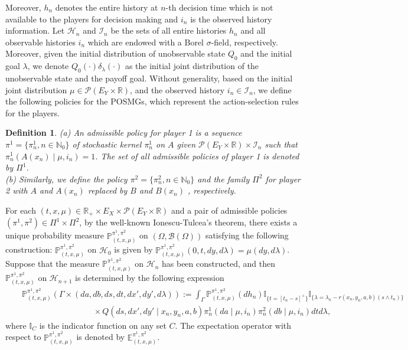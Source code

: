 \documentclass[12pt]{article}
\newtheorem{definition}{Definition}
\begin{document}
Moreover, $h_n$ denotes the entire history at $n$-th decision time which is  not available to the players for decision making and $i_n$ is the observed history  information.
Let $\mathscr{H}_n$ and $\mathscr{I}_n$ be the sets of all entire histories $h_n$ and all observable histories $i_n$ which are endowed with a Borel $\sigma$-field, respectively. Moreover, given the initial distribution of unobservable state $Q_0$ and the initial goal $\lambda$, we denote $Q_0(\cdot)\delta_{\lambda}(\cdot)$ as the initial joint distribution of  the unobservable state and the payoff goal. Without generality,
based on the initial joint distribution $\mu\in \mathscr{P}(E_Y\times \mathbb{R})$, and  the observed history $i_n\in  \mathscr{I}_n$, we define the following policies for the POSMGs, which represent the action-selection rules for the players.
\begin{definition}
	(a) An admissible policy for player 1 is a sequence $\pi^1=\{\pi_n^1,n\in\mathbb{N}_0\}$ of stochastic kernel $\pi_n^1$ on $A$
	given $\mathscr{P}(E_Y\times \mathbb{R}) \times \mathscr{I}_n$ such that $\pi_n^1(A(x_n)\mid \mu,i_n)=1$.
	The set of all admissible policies of player 1 is denoted by $\Pi^1$.\\
	(b) Similarly, we define the policy $\pi^2=\{\pi_n^2,n\in\mathbb{N}_0\}$ and the family $\Pi^2$ for player 2 with $A$ and $A(x_n)$ replaced by $B$ and $B(x_n)$ , respectively.
\end{definition}

For each $(t,x,\mu)\in \mathbb{R}_+\times E_X\times \mathscr{P}(E_Y\times \mathbb{R})$ and a pair of admissible policies $(\pi^1,\pi^2)\in \Pi^1\times \Pi^2$, by the well-known Ionescu-Tulcea's theorem, there exists a unique probability measure $\mathbb{P}^{\pi^1,\pi^2}_{(t,x,\mu)}$ on $(\Omega,\mathscr{B}(\Omega))$ satisfying the following construction:
$\mathbb{P}^{\pi^1,\pi^2}_{(t,x,\mu)}$ on $\mathscr{H}_0$ is given by $\mathbb{P}^{\pi^1,\pi^2}_{(t,x,\mu)}(0,t,dy,d\lambda)=\mu(dy,d\lambda)$.
Suppose that the measure $\mathbb{P}^{\pi^1,\pi^2}_{(t,x,\mu)}$ on $\mathscr{H}_n$ has been constructed, and then
$\mathbb{P}^{\pi^1,\pi^2}_{(t,x,\mu)}$  on $\mathscr{H}_{n+1}$ is determined by the following expression
\begin{eqnarray*}
	&&\mathbb{P}^{\pi^1,\pi^2}_{(t,x,\mu)}(\Gamma\times (da,db,ds,dt,dx',dy',d\lambda)):=\int_{\Gamma}\mathbb{P}^{\pi^1,\pi^2}_{(t,x,\mu)}(dh_n)\mathbb{I}_{\{t=[t_n-s]^+\}}\mathbb{I}_{\{\lambda=\lambda_n-r(x_n,y_n,a,b)(s\wedge t_n)\}}
	\nonumber\\
	&&~~~~~~~~~~~~~~~~~~~~~~~~~~~~~~~~~~~~~~~\times	Q(ds,dx',dy'\mid x_n,y_n,a,b)\pi_n^1(da\mid \mu, i_n)\pi_n^2(db\mid \mu,i_n)dtd\lambda,
\end{eqnarray*}
where $\mathbb{I}_C$ is the indicator function on any set $C$.
The expectation operator with respect to $\mathbb{P}^{\pi^1,\pi^2}_{(t,x,\mu)}$ is denoted by $\mathbb{E}^{\pi^1,\pi^2}_{(t,x,\mu)}$. 
\end{document}

